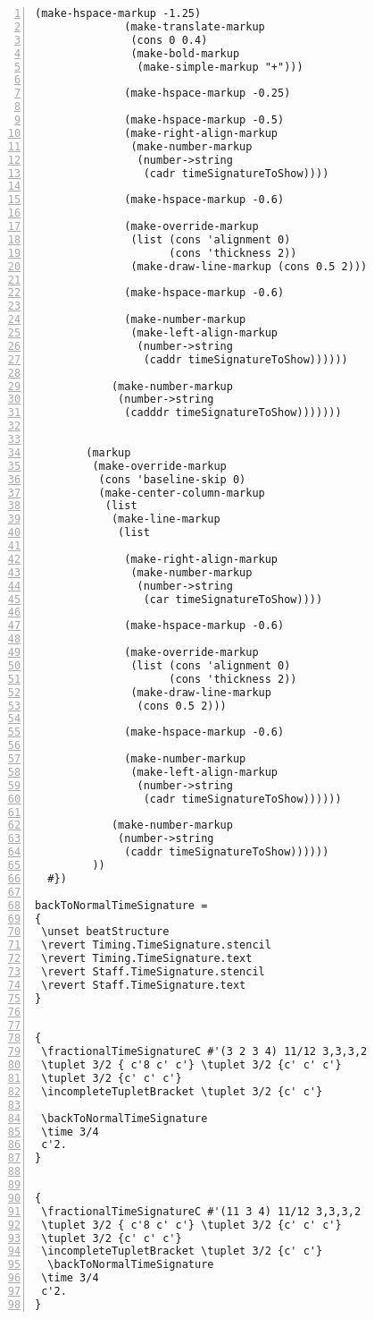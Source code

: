 \begin{Verbatim}[numbers=left,xleftmargin=5mm]
              (make-hspace-markup -1.25)
              (make-translate-markup
               (cons 0 0.4)
               (make-bold-markup
                (make-simple-markup "+")))

              (make-hspace-markup -0.25)

              (make-hspace-markup -0.5)
              (make-right-align-markup
               (make-number-markup
                (number->string
                 (cadr timeSignatureToShow))))

              (make-hspace-markup -0.6)

              (make-override-markup
               (list (cons 'alignment 0)
                     (cons 'thickness 2))
               (make-draw-line-markup (cons 0.5 2)))

              (make-hspace-markup -0.6)

              (make-number-markup
               (make-left-align-markup
                (number->string
                 (caddr timeSignatureToShow))))))

            (make-number-markup
             (number->string
              (cadddr timeSignatureToShow)))))))


        (markup
         (make-override-markup
          (cons 'baseline-skip 0)
          (make-center-column-markup
           (list
            (make-line-markup
             (list

              (make-right-align-markup
               (make-number-markup
                (number->string
                 (car timeSignatureToShow))))

              (make-hspace-markup -0.6)

              (make-override-markup
               (list (cons 'alignment 0)
                     (cons 'thickness 2))
               (make-draw-line-markup
                (cons 0.5 2)))

              (make-hspace-markup -0.6)

              (make-number-markup
               (make-left-align-markup
                (number->string
                 (cadr timeSignatureToShow))))))

            (make-number-markup
             (number->string
              (caddr timeSignatureToShow))))))
         ))
  #})

backToNormalTimeSignature =
{
 \unset beatStructure
 \revert Timing.TimeSignature.stencil
 \revert Timing.TimeSignature.text
 \revert Staff.TimeSignature.stencil
 \revert Staff.TimeSignature.text
}


{
 \fractionalTimeSignatureC #'(3 2 3 4) 11/12 3,3,3,2
 \tuplet 3/2 { c'8 c' c'} \tuplet 3/2 {c' c' c'}
 \tuplet 3/2 {c' c' c'}
 \incompleteTupletBracket \tuplet 3/2 {c' c'}

 \backToNormalTimeSignature
 \time 3/4
 c'2.
}


{
 \fractionalTimeSignatureC #'(11 3 4) 11/12 3,3,3,2
 \tuplet 3/2 { c'8 c' c'} \tuplet 3/2 {c' c' c'}
 \tuplet 3/2 {c' c' c'}
 \incompleteTupletBracket \tuplet 3/2 {c' c'}
  \backToNormalTimeSignature
 \time 3/4
 c'2.
}
\end{Verbatim}

